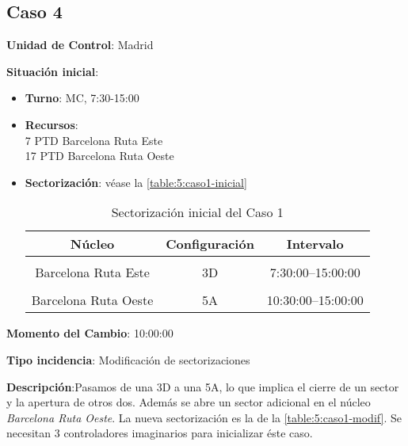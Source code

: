 \subsection{Caso 4}

\textbf{Unidad de Control}: Madrid

\textbf{Situación inicial}:
\begin{itemize}[label={}]
	
	\item \textbf{Turno}: MC, 7:30-15:00
	
	\item \textbf{Recursos}: \\
	7 PTD Barcelona Ruta Este \\
	17 PTD Barcelona Ruta Oeste
	
	
	\item \textbf{Sectorización}: véase la \autoref{table:5:caso1-inicial}
	\begin{table}[h]
		\centering
		\caption{Sectorización inicial del Caso 1}
		\begin{tabular}{ccc}
			\hline
			\textbf{Núcleo}      & \textbf{Configuración} & \textbf{Intervalo}   \\ \hline
			\multicolumn{1}{l}{} & \multicolumn{1}{l}{}   & \multicolumn{1}{l}{} \\
			Barcelona Ruta Este  & 3D                     & 7:30:00--15:00:00    \\
			\multicolumn{1}{l}{} & \multicolumn{1}{l}{}   & \multicolumn{1}{l}{} \\
			Barcelona Ruta Oeste & 5A                     & 10:30:00--15:00:00   \\ \hline
		\end{tabular}
		\label{table:5:caso1-inicial}
	\end{table}
	
	
\end{itemize}

\textbf{Momento del Cambio}: 10:00:00

\textbf{Tipo incidencia}: Modificación de sectorizaciones

\textbf{Descripción}:Pasamos de una 3D a una 5A, lo que implica el cierre de un sector y la apertura de otros dos. Además se abre un sector adicional en el núcleo \textit{Barcelona Ruta Oeste}. La nueva sectorización es la de la \autoref{table:5:caso1-modif}. Se necesitan 3 controladores imaginarios para inicializar éste caso.

